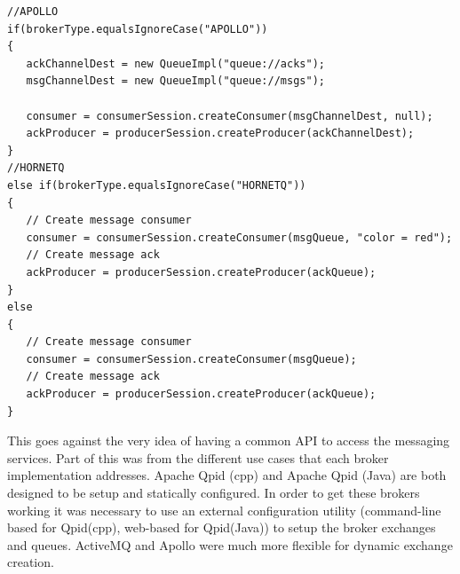 \documentclass{thesis}
\begin{document}
\begin{lstlisting}
//APOLLO
if(brokerType.equalsIgnoreCase("APOLLO"))
{
   ackChannelDest = new QueueImpl("queue://acks");
   msgChannelDest = new QueueImpl("queue://msgs");
        	
   consumer = consumerSession.createConsumer(msgChannelDest, null);
   ackProducer = producerSession.createProducer(ackChannelDest);
}
//HORNETQ
else if(brokerType.equalsIgnoreCase("HORNETQ"))
{
   // Create message consumer
   consumer = consumerSession.createConsumer(msgQueue, "color = red");
   // Create message ack
   ackProducer = producerSession.createProducer(ackQueue);
}
else
{
   // Create message consumer
   consumer = consumerSession.createConsumer(msgQueue);
   // Create message ack
   ackProducer = producerSession.createProducer(ackQueue);
}
\end{lstlisting}

This goes against the very idea of having a common API to access the messaging services.  Part of this was from the different use cases that each broker implementation addresses.  Apache Qpid (cpp) and Apache Qpid (Java) are both designed to be setup and statically configured.  In order to get these brokers working it was necessary to use an external configuration utility (command-line based for Qpid(cpp), web-based for Qpid(Java)) to setup the broker exchanges and queues.  ActiveMQ and Apollo were much more flexible for dynamic exchange creation.  
\end{document}
